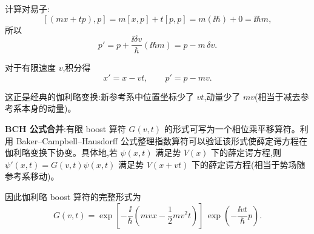 \begin{solution}
	计算对易子:
	\[
	[(mx+tp),p] = m[x,p] + t[p,p] = m(\ii\hbar) + 0 = \ii\hbar m,
	\]
	所以
	\[
	p' = p + \frac{\ii\delta v}{\hbar}(\ii\hbar m) = p - m\,\delta v.
	\]

	对于有限速度 $v$,积分得
	\[
	\boxed{x' = x - vt},\qquad
	\boxed{p' = p - mv}.
	\]

	这正是经典的伽利略变换:新参考系中位置坐标少了 $vt$,动量少了 $mv$(相当于减去参考系本身的动量)。

	\textbf{BCH 公式合并}:有限 boost 算符 $G(v,t)$ 的形式可写为一个相位乘平移算符。利用 Baker--Campbell--Hausdorff 公式整理指数算符可以验证该形式使薛定谔方程在伽利略变换下协变。具体地,若 $\psi(x,t)$ 满足势 $V(x)$ 下的薛定谔方程,则 $\psi'(x,t)=G(v,t)\psi(x,t)$ 满足势 $V(x+vt)$ 下的薛定谔方程(相当于势场随参考系移动)。

	因此伽利略 boost 算符的完整形式为
	\[
	\boxed{G(v,t)=\exp\!\left[-\frac{\ii}{\hbar}\left(mvx-\frac12 mv^2t\right)\right]\,\exp\!\left(-\frac{\ii v t}{\hbar}p\right)}.
	\]
	\end{solution}

